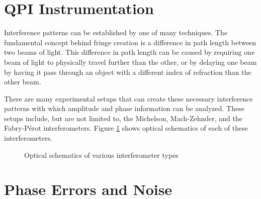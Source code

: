 \documentclass[10pt,letterpaper]{article}
\begin{document}
\section{QPI Instrumentation}

 Interference patterns can be established by one of many techniques. The fundamental concept behind fringe creation is a difference in path length between two beams of light. This difference in path length can be caused by requiring one beam of light to physically travel further than the other, or by delaying one beam by having it pass through an object with a different index of refraction than the other beam.
 
 There are many experimental setups that can create these necessary interference patterns with which amplitude and phase information can be analyzed. These setups include, but are not limited to, the Michelson, Mach-Zehnder, and the Fabry-P\'{e}rot interferometers. Figure \ref{fig:types} shows optical schematics of each of these interferometers.
 
 \begin{figure}
 \centering
 \label{fig:types}
 \caption{Optical schematics of various interferometer types}
 \end{figure}
 
 
 

 
\section{Phase Errors and Noise}
\end{document}
